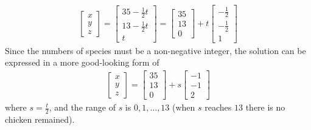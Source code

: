 \begin{Answer}
\begin{align*}
\begin{bmatrix}
x \\
y \\
z
\end{bmatrix}
=
\begin{bmatrix}
35-\frac{1}{2}t \\
13-\frac{1}{2}t \\
t
\end{bmatrix}
=
\begin{bmatrix}
35 \\
13 \\
0
\end{bmatrix}
+
t
\begin{bmatrix}
-\frac{1}{2} \\
-\frac{1}{2} \\
1
\end{bmatrix}
\end{align*}
Since the numbers of species must be a non-negative integer, the solution can be expressed in a more good-looking form of
\begin{align*}
\begin{bmatrix}
x \\
y \\
z
\end{bmatrix}
=
\begin{bmatrix}
35 \\
13 \\
0
\end{bmatrix}
+
s
\begin{bmatrix}
-1 \\
-1 \\
2
\end{bmatrix}
\end{align*}
where $s = \frac{t}{2}$, and the range of $s$ is $0, 1, \ldots, 13$ (when $s$ reaches $13$ there is no chicken remained).
\end{Answer}